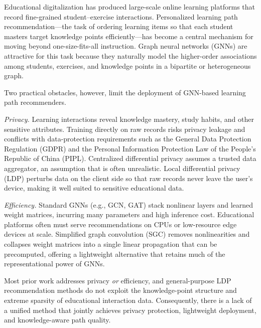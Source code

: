 \documentclass[sn-mathphys]{sn-jnl}
\begin{document}
Educational digitalization has produced large-scale online learning platforms that record fine-grained student--exercise interactions. Personalized learning path recommendation---the task of ordering learning items so that each student masters target knowledge points efficiently---has become a central mechanism for moving beyond one-size-fits-all instruction. Graph neural networks (GNNs) are attractive for this task because they naturally model the higher-order associations among students, exercises, and knowledge points in a bipartite or heterogeneous graph.

Two practical obstacles, however, limit the deployment of GNN-based learning path recommenders.

\emph{Privacy.} Learning interactions reveal knowledge mastery, study habits, and other sensitive attributes. Training directly on raw records risks privacy leakage and conflicts with data-protection requirements such as the General Data Protection Regulation (GDPR) and the Personal Information Protection Law of the People's Republic of China (PIPL). Centralized differential privacy assumes a trusted data aggregator, an assumption that is often unrealistic. Local differential privacy (LDP) perturbs data on the client side so that raw records never leave the user's device, making it well suited to sensitive educational data.

\emph{Efficiency.} Standard GNNs (e.g., GCN, GAT) stack nonlinear layers and learned weight matrices, incurring many parameters and high inference cost. Educational platforms often must serve recommendations on CPUs or low-resource edge devices at scale. Simplified graph convolution (SGC) removes nonlinearities and collapses weight matrices into a single linear propagation that can be precomputed, offering a lightweight alternative that retains much of the representational power of GNNs.

Most prior work addresses privacy \emph{or} efficiency, and general-purpose LDP recommendation methods do not exploit the knowledge-point structure and extreme sparsity of educational interaction data. Consequently, there is a lack of a unified method that jointly achieves privacy protection, lightweight deployment, and knowledge-aware path quality.
\end{document}
